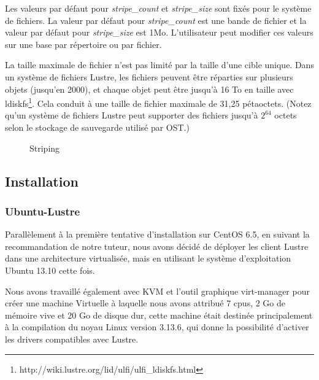 \documentclass[12pt]{article}
\begin{document}
Les valeurs par défaut pour \textit{stripe\_count} et \textit{stripe\_size} sont fixés pour le système de fichiers. La valeur par défaut pour \textit{stripe\_count} est une bande de fichier et la valeur par défaut pour \textit{stripe\_size} est 1Mo. L'utilisateur peut modifier ces valeurs sur une base par répertoire ou par fichier.

La taille maximale de fichier n'est pas limité par la taille d'une cible unique. Dans un système de fichiers Lustre, les fichiers peuvent être réparties sur plusieurs objets (jusqu'en 2000), et chaque objet peut être jusqu'à 16 To en taille avec ldiskfs\footnote{http://wiki.lustre.org/lid/ulfi/ulfi\_ldiskfs.html}. Cela conduit à une taille de fichier maximale de 31,25 pétaoctets. (Notez qu'un système de fichiers Lustre peut supporter des fichiers jusqu'à \begin{math}2^{64}\end{math} octets selon le stockage de sauvegarde utilisé par OST.)

\begin{figure}[Striping]
\caption{Striping}
\label{fig:identification}
\end{figure}


\newpage
\subsection{Installation}
\newpage
\subsubsection{Ubuntu-Lustre}
Parallèlement à la première tentative d'installation sur CentOS 6.5, en suivant la recommandation de notre tuteur, nous avons décidé de déployer les client Lustre dans une architecture virtualisée, mais en utilisant le système d'exploitation Ubuntu 13.10 cette fois.

Nous avons travaillé également avec KVM et l'outil graphique virt-manager pour créer une machine Virtuelle à laquelle nous avons attribué 7 cpus, 2 Go de mémoire vive et 20 Go de disque dur, cette machine était destinée principalement à la compilation du noyau Linux version 3.13.6, qui donne la possibilité d'activer les drivers compatibles avec Lustre.
\end{document}
